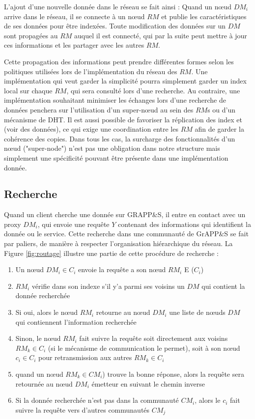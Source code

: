 L'ajout d'une nouvelle donnée dans le réseau se fait ainsi : Quand un n{\oe}ud $DM_i$ arrive dans le réseau, il se connecte à un n{\oe}ud $RM$ et publie les caractéristiques de ses données pour être indexées. Toute modification des données sur un $DM$ sont propagées au $RM$ auquel il est connecté, qui par la suite peut mettre à jour ces informations et les partager avec les autres $RM$. 

Cette propagation des informations peut prendre différentes formes selon les politiques utilisées lors de l'implémentation du réseau des $RM$. Une implémentation qui veut garder la simplicité pourra simplement garder un index local sur chaque $RM$, qui sera consulté lors d'une recherche. Au contraire, une implémentation souhaitant minimiser les échanges lors d'une recherche de données penchera sur l'utilisation d'un super-n{\oe}ud au sein des $RM$s ou d'un mécanisme de DHT. Il est aussi possible de favoriser la réplication des index et (voir des données), ce qui exige une coordination entre les $RM$ afin de garder la cohérence des copies. Dans tous les cas, la surcharge des fonctionnalités d'un n{\oe}ud ("super-node") n'est pas une obligation dans notre structure mais simplement une spécificité pouvant être présente dans une implémentation donnée. 

\subsection{Recherche}
Quand un client cherche une donnée sur GRAPP\&S, il entre en contact avec un proxy $DM_i$, qui envoie une requête $Y$ contenant des informations qui identifient la donnée ou le service. Cette recherche dans une communauté de GrAPP\&S se fait par paliers, de manière à respecter l'organisation hiérarchique du réseau. La Figure \ref{fig:routage} illustre une partie de cette procédure de recherche : 
\begin{enumerate}
	\item Un n{\oe}ud $DM_i \in C_i$ envoie la requête a son n{\oe}ud $RM_i$ E ($C_i$)
	\item $RM_i$ vérifie dans son indexe s'il y'a parmi ses voisins un $DM$ qui contient la donnée recherchée
	\item Si oui, alors le n{\oe}ud $RM_i$ retourne au n{\oe}ud $DM_i$  une liste de n{\oe}uds $DM$ qui contiennent l'information recherchée
	\item Sinon, le n{\oe}ud $RM_i$ fait suivre la requête soit directement aux voisins $RM_k \in C_i$ (si le mécanisme de communication le permet), soit à son n{\oe}ud $c_i \in C_i$ pour retransmission aux autres $RM_k \in C_i$
	\item quand un  n{\oe}ud $RM_k \in CM_i$) trouve la bonne réponse, alors la requête sera retournée au n{\oe}ud $DM_i$ émetteur en suivant le chemin inverse 
	\item Si la donnée recherchée n'est pas dans la communauté $CM_i$, alors le $c_i$ fait suivre la requête vers d'autres communautés $CM_j$     
\end{enumerate}

